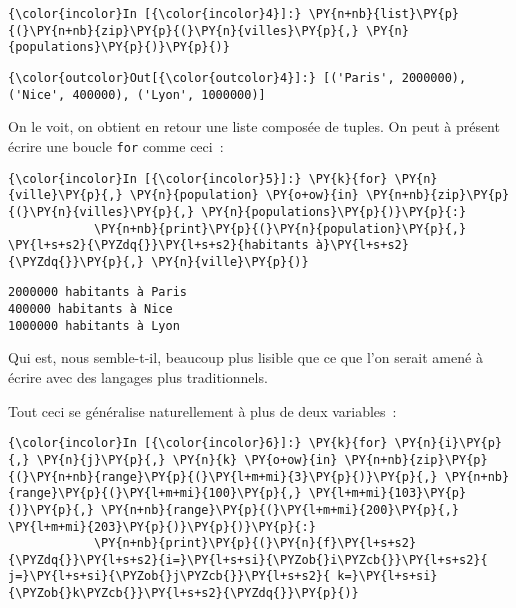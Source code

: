     \begin{Verbatim}[commandchars=\\\{\}]
{\color{incolor}In [{\color{incolor}4}]:} \PY{n+nb}{list}\PY{p}{(}\PY{n+nb}{zip}\PY{p}{(}\PY{n}{villes}\PY{p}{,} \PY{n}{populations}\PY{p}{)}\PY{p}{)}
\end{Verbatim}


\begin{Verbatim}[commandchars=\\\{\}]
{\color{outcolor}Out[{\color{outcolor}4}]:} [('Paris', 2000000), ('Nice', 400000), ('Lyon', 1000000)]
\end{Verbatim}
            
    On le voit, on obtient en retour une liste composée de tuples. On peut à
présent écrire une boucle \texttt{for} comme ceci~:

    \begin{Verbatim}[commandchars=\\\{\}]
{\color{incolor}In [{\color{incolor}5}]:} \PY{k}{for} \PY{n}{ville}\PY{p}{,} \PY{n}{population} \PY{o+ow}{in} \PY{n+nb}{zip}\PY{p}{(}\PY{n}{villes}\PY{p}{,} \PY{n}{populations}\PY{p}{)}\PY{p}{:}
            \PY{n+nb}{print}\PY{p}{(}\PY{n}{population}\PY{p}{,} \PY{l+s+s2}{\PYZdq{}}\PY{l+s+s2}{habitants à}\PY{l+s+s2}{\PYZdq{}}\PY{p}{,} \PY{n}{ville}\PY{p}{)}
\end{Verbatim}


    \begin{Verbatim}[commandchars=\\\{\}]
2000000 habitants à Paris
400000 habitants à Nice
1000000 habitants à Lyon

    \end{Verbatim}

    Qui est, nous semble-t-il, beaucoup plus lisible que ce que l'on serait
amené à écrire avec des langages plus traditionnels.

Tout ceci se généralise naturellement à plus de deux variables~:

    \begin{Verbatim}[commandchars=\\\{\}]
{\color{incolor}In [{\color{incolor}6}]:} \PY{k}{for} \PY{n}{i}\PY{p}{,} \PY{n}{j}\PY{p}{,} \PY{n}{k} \PY{o+ow}{in} \PY{n+nb}{zip}\PY{p}{(}\PY{n+nb}{range}\PY{p}{(}\PY{l+m+mi}{3}\PY{p}{)}\PY{p}{,} \PY{n+nb}{range}\PY{p}{(}\PY{l+m+mi}{100}\PY{p}{,} \PY{l+m+mi}{103}\PY{p}{)}\PY{p}{,} \PY{n+nb}{range}\PY{p}{(}\PY{l+m+mi}{200}\PY{p}{,} \PY{l+m+mi}{203}\PY{p}{)}\PY{p}{)}\PY{p}{:}
            \PY{n+nb}{print}\PY{p}{(}\PY{n}{f}\PY{l+s+s2}{\PYZdq{}}\PY{l+s+s2}{i=}\PY{l+s+si}{\PYZob{}i\PYZcb{}}\PY{l+s+s2}{ j=}\PY{l+s+si}{\PYZob{}j\PYZcb{}}\PY{l+s+s2}{ k=}\PY{l+s+si}{\PYZob{}k\PYZcb{}}\PY{l+s+s2}{\PYZdq{}}\PY{p}{)}
\end{Verbatim}


